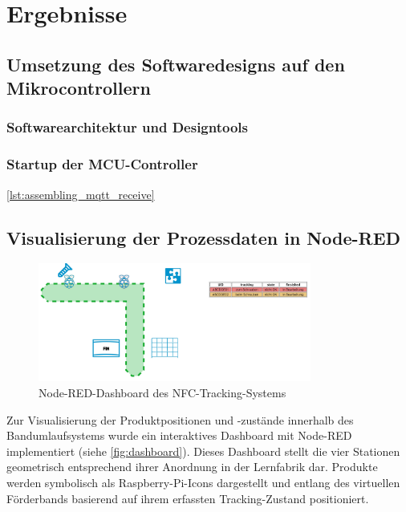 \chapter{Ergebnisse}
\label{cha:umsetzung}
\section{Umsetzung des Softwaredesigns auf den Mikrocontrollern}
\label{sec:Node-MCU}

\subsection*{Softwarearchitektur und Designtools}

\subsection*{Startup der MCU-Controller}



\autoref{lst:assembling_mqtt_receive}

\section{Visualisierung der Prozessdaten in Node-RED}
\label{sec:Node-Red}

\begin{figure}[H]
	\centering
	\includegraphics[width=0.8\textwidth]{images/node-red-band.jpeg}
	\caption{Node-RED-Dashboard des NFC-Tracking-Systems}
	\label{fig:dashboard}
\end{figure}

Zur Visualisierung der Produktpositionen und -zustände innerhalb des Bandumlaufsystems wurde ein interaktives Dashboard mit Node-RED implementiert (siehe \autoref{fig:dashboard}). Dieses Dashboard stellt die vier Stationen geometrisch entsprechend ihrer Anordnung in der Lernfabrik dar. Produkte werden symbolisch als Raspberry-Pi-Icons dargestellt und entlang des virtuellen Förderbands basierend auf ihrem erfassten Tracking-Zustand positioniert.

